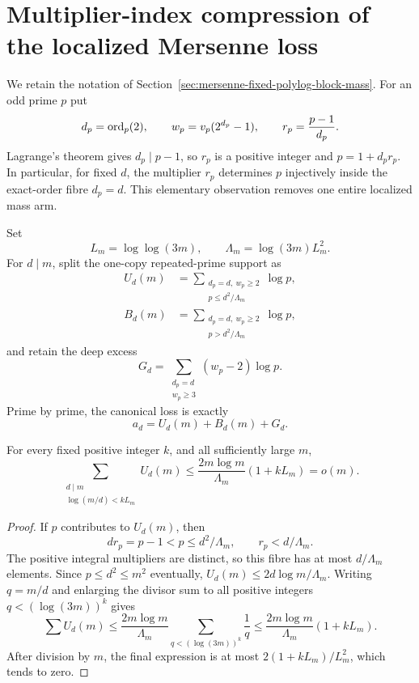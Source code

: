\section{Multiplier-index compression of the localized Mersenne loss}
\label{sec:mersenne-multiplier-index-two-arm}

We retain the notation of
Section~\ref{sec:mersenne-fixed-polylog-block-mass}.  For an odd prime $p$ put
\[
 d_p=\operatorname{ord}_p(2),\qquad w_p=v_p(2^{d_p}-1),
 \qquad r_p=\frac{p-1}{d_p}.
\]
Lagrange's theorem gives $d_p\mid p-1$, so $r_p$ is a positive integer and
$p=1+d_pr_p$.  In particular, for fixed $d$, the multiplier $r_p$ determines
$p$ injectively inside the exact-order fibre $d_p=d$.  This elementary
observation removes one entire localized mass arm.

Set
\[
 L_m=\log\log(3m),\qquad
 \Lambda_m=\log(3m)L_m^2.
\]
For $d\mid m$, split the one-copy repeated-prime support as
\begin{align*}
 U_d(m)&=\sum_{\substack{d_p=d,\ w_p\ge2\\
                         p\le d^2/\Lambda_m}}\log p,\\
 B_d(m)&=\sum_{\substack{d_p=d,\ w_p\ge2\\
                         p>d^2/\Lambda_m}}\log p,
\end{align*}
and retain the deep excess
\[
 G_d=\sum_{\substack{d_p=d\\w_p\ge3}}(w_p-2)\log p.
\]
Prime by prime, the canonical loss is exactly
\begin{equation}\label{eq:multiplier-three-part-exact}
                         a_d=U_d(m)+B_d(m)+G_d.
\end{equation}

\begin{proposition}
\label{prop:mersenne-low-multiplier-estimate}
For every fixed positive integer $k$, and all sufficiently large $m$,
\[
 \sum_{\substack{d\mid m\\\log(m/d)<kL_m}}U_d(m)
 \le \frac{2m\log m}{\Lambda_m}(1+kL_m)=o(m).
\]
\end{proposition}

\begin{proof}
If $p$ contributes to $U_d(m)$, then
\[
       dr_p=p-1<p\le d^2/\Lambda_m,
       \qquad r_p<d/\Lambda_m.
\]
The positive integral multipliers are distinct, so this fibre has at most
$d/\Lambda_m$ elements.  Since $p\le d^2\le m^2$ eventually,
$U_d(m)\le2d\log m/\Lambda_m$.  Writing $q=m/d$ and enlarging the divisor sum
to all positive integers $q<(\log(3m))^k$ gives
\[
 \sum U_d(m)
 \le \frac{2m\log m}{\Lambda_m}
      \sum_{q<(\log(3m))^k}\frac1q
 \le \frac{2m\log m}{\Lambda_m}(1+kL_m).
\]
After division by $m$, the final expression is at most
$2(1+kL_m)/L_m^2$, which tends to zero.
\end{proof}

